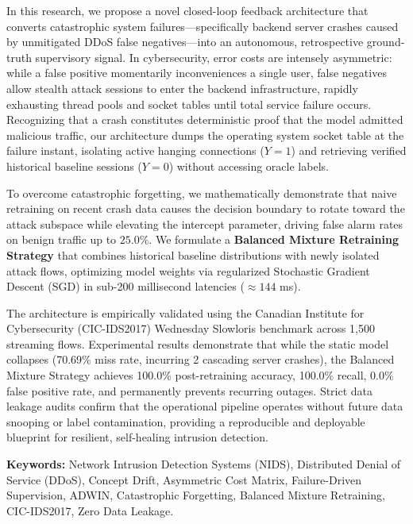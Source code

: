 \documentclass[12pt,a4paper,oneside]{report}
\begin{document}
\vspace{0.4cm}
\noindent In this research, we propose a novel closed-loop feedback architecture that converts catastrophic system failures---specifically backend server crashes caused by unmitigated DDoS false negatives---into an autonomous, retrospective ground-truth supervisory signal. In cybersecurity, error costs are intensely asymmetric: while a false positive momentarily inconveniences a single user, false negatives allow stealth attack sessions to enter the backend infrastructure, rapidly exhausting thread pools and socket tables until total service failure occurs. Recognizing that a crash constitutes deterministic proof that the model admitted malicious traffic, our architecture dumps the operating system socket table at the failure instant, isolating active hanging connections ($Y=1$) and retrieving verified historical baseline sessions ($Y=0$) without accessing oracle labels.

\vspace{0.4cm}
\noindent To overcome catastrophic forgetting, we mathematically demonstrate that naive retraining on recent crash data causes the decision boundary to rotate toward the attack subspace while elevating the intercept parameter, driving false alarm rates on benign traffic up to $25.0\%$. We formulate a \textbf{Balanced Mixture Retraining Strategy} that combines historical baseline distributions with newly isolated attack flows, optimizing model weights via regularized Stochastic Gradient Descent (SGD) in sub-200 millisecond latencies ($\approx 144$ ms).

\vspace{0.4cm}
\noindent The architecture is empirically validated using the Canadian Institute for Cybersecurity (CIC-IDS2017) Wednesday Slowloris benchmark across 1,500 streaming flows. Experimental results demonstrate that while the static model collapses (70.69\% miss rate, incurring 2 cascading server crashes), the Balanced Mixture Strategy achieves 100.0\% post-retraining accuracy, 100.0\% recall, 0.0\% false positive rate, and permanently prevents recurring outages. Strict data leakage audits confirm that the operational pipeline operates without future data snooping or label contamination, providing a reproducible and deployable blueprint for resilient, self-healing intrusion detection.

\vspace{0.8cm}
\noindent \textbf{Keywords:} Network Intrusion Detection Systems (NIDS), Distributed Denial of Service (DDoS), Concept Drift, Asymmetric Cost Matrix, Failure-Driven Supervision, ADWIN, Catastrophic Forgetting, Balanced Mixture Retraining, CIC-IDS2017, Zero Data Leakage.
\end{document}
